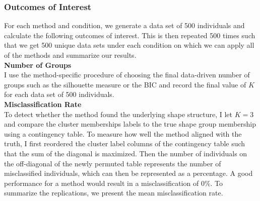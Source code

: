 \documentclass[12pt]{article}
\begin{document}
\subsubsection{Outcomes of Interest}
For each method and condition, we generate a data set of 500 individuals and calculate the following outcomes of interest. This is then repeated 500 times such that we get 500 unique data sets under each condition on which we can apply all of the methods and summarize our results.\\

\textbf{Number of Groups}\\
I use the method-specific procedure of choosing the final data-driven number of groups such as the silhouette measure or the BIC and record the final value of $K$ for each data set of 500 individuals. \\

\textbf{Misclassification Rate}\\
To detect whether the method found the underlying shape structure, I let $K=3$ and compare the cluster memberships labels to the true shape group membership using a contingency table. To measure how well the method aligned with the truth, I first reordered the cluster label columns of the contingency table such that the sum of the diagonal is maximized. Then the number of individuals on the off-diagonal of the newly permuted table represents the number of misclassified individuals, which can then be represented as a percentage. A good performance for a method would result in a misclassification of 0\%. To summarize the replications, we present the mean misclassification rate.\\
\end{document}
